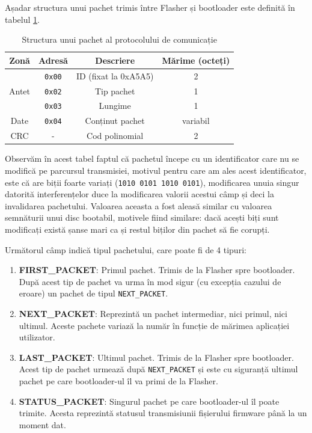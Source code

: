 \documentclass[12pt,a4paper,titlepage]{report}
\begin{document}
Așadar structura unui pachet trimis între Flasher și bootloader este definită în tabelul \ref{protoStruct}.

\begin{table}[h]
    \begin{tabular}{ | c | c | c | c | }
        \hline
        \textbf{Zonă} & \textbf{Adresă} & \textbf{Descriere} & \textbf{Mărime (octeți)} \\ \hline
        \multirow{3}{*}{Antet} & \texttt{0x00} & ID (fixat la 0xA5A5) & 2 \\ \cline{2-4}
                               & \texttt{0x02} & Tip pachet & 1 \\ \cline{2-4}
                               & \texttt{0x03} & Lungime & 1 \\ \hline   
        Date                   & \texttt{0x04} & Conținut pachet & variabil \\ \hline
        CRC                    & - & Cod polinomial & 2 \\ \hline
    \end{tabular}
    \centering
    \caption{Structura unui pachet al protocolului de comunicație}
    \label{protoStruct}
\end{table}

Observăm în acest tabel faptul că pachetul începe cu un identificator care nu se modifică pe parcursul transmisiei, motivul pentru care am ales acest identificator, este că are biții foarte variați (\texttt{1010 0101 1010 0101}), modificarea unuia singur datorită interferențelor duce la modificarea valorii acestui câmp și deci la invalidarea pachetului. Valoarea aceasta a fost aleasă similar cu valoarea semnăturii unui disc bootabil, motivele fiind similare: dacă acești biți sunt modificați există șanse mari ca și restul biților din pachet să fie corupți.

Următorul câmp indică tipul pachetului, care poate fi de 4 tipuri:
\begin{enumerate}
\item \textbf{FIRST\_PACKET}: Primul pachet. Trimis de la Flasher spre bootloader. După acest tip de pachet va urma în mod sigur (cu excepția cazului de eroare) un pachet de tipul \texttt{NEXT\_PACKET}.
\item \textbf{NEXT\_PACKET}: Reprezintă un pachet intermediar, nici primul, nici ultimul. Aceste pachete variază la număr în funcție de mărimea aplicației utilizator.
\item \textbf{LAST\_PACKET}: Ultimul pachet. Trimis de la Flasher spre bootloader. Acest tip de pachet urmează după \texttt{NEXT\_PACKET} și este cu siguranță ultimul pachet pe care bootloader-ul îl va primi de la Flasher.
\item \textbf{STATUS\_PACKET}: Singurul pachet pe care bootloader-ul îl poate trimite. Acesta reprezintă statusul transmisiunii fișierului firmware până la un moment dat.
\end{enumerate}
\end{document}
